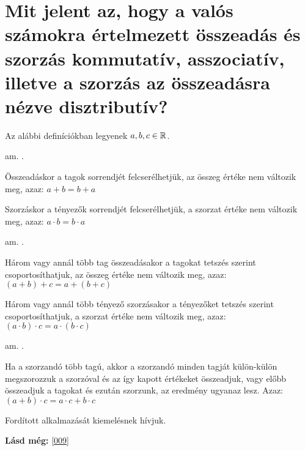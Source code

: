 
\section{Mit jelent az, hogy a valós számokra értelmezett összeadás és szorzás
kommutatív, asszociatív, illetve a szorzás az összeadásra nézve disztributív?}
\label{004}

Az alábbi definíciókban legyenek $a, b, c \in \mathbb{R}$.

\begin{defin}[Kommutativitás]
\label{def:commutat}
am. .

Összeadáskor a tagok sorrendjét felcserélhetjük, az összeg értéke nem változik
meg, azaz: $a + b = b + a$

Szorzáskor a tényezők sorrendjét felcserélhetjük, a szorzat értéke nem változik
meg, azaz: $a \cdot b = b \cdot a$
\end{defin}

\begin{defin}[Asszociativitás]
\label{def:assoc}
am. .

Három vagy annál több tag összeadásakor a tagokat tetszés szerint
csoportosíthatjuk, az összeg értéke nem változik meg, azaz:
$(a + b) + c = a + (b + c)$

Három vagy annál több tényező szorzásakor a tényezőket tetszés szerint
csoportosíthatjuk, a szorzat értéke nem változik meg, azaz:
$(a \cdot b) \cdot c = a \cdot (b \cdot c)$
\end{defin}

\begin{defin}[Disztributivitás]
am. .

Ha a szorzandó több tagú, akkor a szorzandó minden tagját külön-külön
megszorozzuk a szorzóval és az így kapott értékeket összeadjuk, vagy előbb
összeadjuk a tagokat és ezután szorzunk, az eredmény ugyanaz lesz. Azaz:
$(a + b) \cdot c = a \cdot c + b \cdot c$

Fordított alkalmazását kiemelésnek hívjuk.
\end{defin}

\textbf{Lásd még:} \ref{009}

